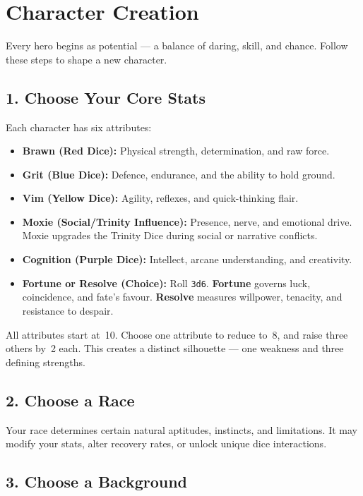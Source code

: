 \section{Character Creation}

\noindent
Every hero begins as potential — a balance of daring, skill, and chance.
Follow these steps to shape a new character.

\subsection*{1. Choose Your Core Stats}

Each character has six attributes:

\begin{itemize}
  \item \textbf{Brawn (Red Dice):} Physical strength, determination, and raw force.
  \item \textbf{Grit (Blue Dice):} Defence, endurance, and the ability to hold ground.
  \item \textbf{Vim (Yellow Dice):} Agility, reflexes, and quick-thinking flair.
  \item \textbf{Moxie (Social/Trinity Influence):} Presence, nerve, and emotional drive.  Moxie upgrades the Trinity Dice during social or narrative conflicts.
  \item \textbf{Cognition (Purple Dice):} Intellect, arcane understanding, and creativity.
  \item \textbf{Fortune or Resolve (Choice):}  
        Roll \texttt{3d6}.  
        \textbf{Fortune} governs luck, coincidence, and fate’s favour.  
        \textbf{Resolve} measures willpower, tenacity, and resistance to despair.
\end{itemize}

All attributes start at~10.  
Choose one attribute to reduce to~8, and raise three others by~2 each.  
This creates a distinct silhouette — one weakness and three defining strengths.

\subsection*{2. Choose a Race}

Your race determines certain natural aptitudes, instincts, and limitations.
It may modify your stats, alter recovery rates, or unlock unique dice interactions.

\subsection*{3. Choose a Background}

